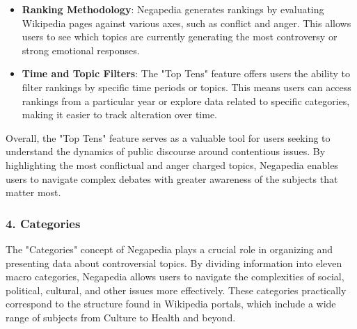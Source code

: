 \begin{itemize}
    \item \textbf{Ranking Methodology}: Negapedia generates rankings by evaluating Wikipedia pages against various axes, such as conflict and anger. This allows users to see which topics are currently generating the most controversy or strong emotional responses.
    \item \textbf{Time and Topic Filters}: The "Top Tens" feature offers users the ability to filter rankings by specific time periods or topics. This means users can access rankings from a particular year or explore data related to specific categories, making it easier to track alteration over time.
    \begin{comment}  \item \textbf{Compact Synthesis of Data}: By providing these rankings, Negapedia offers a compact synthesis of negativity that is more digestible than raw data. Users can quickly grasp which topics are lately leading in discussions, enhancing their understanding of societal issues. \end{comment}
\end{itemize}

Overall, the "Top Tens" feature serves as a valuable tool for users seeking to understand the dynamics of public discourse around contentious issues. By highlighting the most conflictual and anger charged topics, Negapedia enables users to navigate complex debates with greater awareness of the subjects that matter most.

\subsubsection{4. Categories}

The "Categories" concept of Negapedia plays a crucial role in organizing and presenting data about controversial topics. By dividing information into eleven macro categories, Negapedia allows users to navigate the complexities of social, political, cultural, and other issues more effectively. These categories practically correspond to the structure found in Wikipedia portals, which include a wide range of subjects from Culture to Health and beyond.


